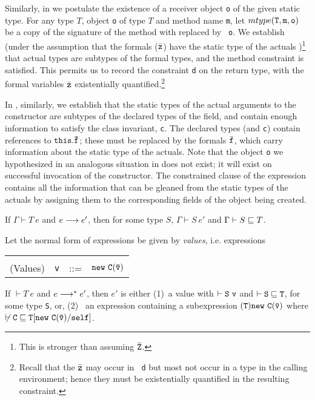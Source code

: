 Similarly, in \TInvk{} we postulate the existence of a receiver object
{\tt o} of the given static type. For any type $T$, object {\tt o} of
type $T$ and method name {\tt m}, let $mtype({\tt T},{\tt m},{\tt o})$
be a copy of the signature of the method with \this{} replaced by {\tt
o}. We establish (under the assumption that the formals ($\bar{\tt
z}$) have the static type of the actuals
)\footnote{This is stronger than assuming $\bar{\tt Z}$.}
that actual types are
subtypes of the formal types, and the method constraint is
satisfied. This permits us to record the constraint {\tt d} on the
return type, with the formal variables $\bar{\tt z}$ existentially
quantified.\footnote{Recall that the $\bar{\tt z}$ may occur in {\tt
d} but most not occur in a type in the calling environment; hence they
must be existentially quantified in the resulting constraint.}

In \TNew, similarly, we establish that the static types of the actual
arguments to the constructor are subtypes of the declared types of the
field, and contain enough information to satisfy the class invariant,
{\tt c}. The declared types (and {\tt c}) contain references to ${\tt
this.\bar{\tt f}}$; these must be replaced by the formals $\bar{\tt
f}$, which carry information about the static type of the
actuals. Note that the object {\tt o} we hypothesized in an analogous
situation in \TInvk{} does not exist; it will exist on successful
invocation of the constructor. The constrained clause of the \new{}
expression contains all the information that can be gleaned from the
static types of the actuals by assigning them to the corresponding
fields of the object being created.


\begin{theorem} 

If $\Gamma \vdash T\ e$ and $e \derives e'$, then for some type $S$,
$\Gamma \vdash S\ e'$ and $\Gamma \vdash S \subtype T$.

\end{theorem}


Let the normal form of expressions be given by {\em values},
i.e. expressions 

\begin{tabular}{rrcl}
&&&\\
(Values) & {\tt v} &{::=}& $\new\ {\tt C(\bar{\tt v})}$
\end{tabular}


\begin{theorem} 

If $\vdash T\ e$ and $e \starderives e'$, then $e'$ is
either (1)~a value {\tt } with $\vdash {\tt S\ v}$ and $\vdash {\tt S
\subtype T}$, for some type {\tt S}, or, (2)~ an expression containing
a subexpression ${\tt (T)\new\ C(\bar{\tt v})}$ where 
$\not\vdash \tt C\subtype T[\new\ C(\bar{\tt v})/\self]$.

\end{theorem}

